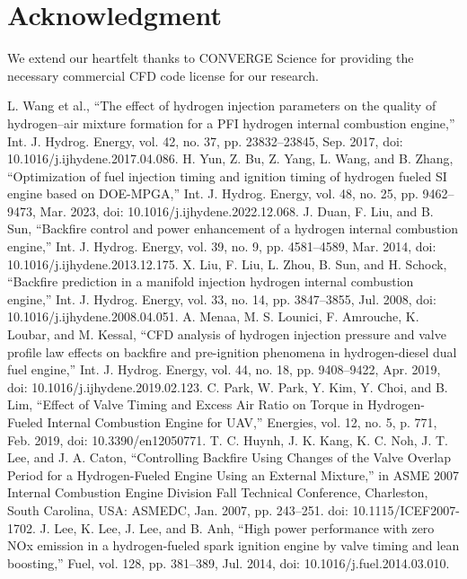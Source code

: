 \documentclass[conference]{IEEEtran}
\begin{document}
\section*{Acknowledgment}
We extend our heartfelt thanks to CONVERGE Science for providing the necessary commercial CFD code license for our research.

\begin{thebibliography}{00}
 L. Wang et al., “The effect of hydrogen injection parameters on the quality of hydrogen–air mixture formation for a PFI hydrogen internal combustion engine,” Int. J. Hydrog. Energy, vol. 42, no. 37, pp. 23832–23845, Sep. 2017, doi: 10.1016/j.ijhydene.2017.04.086.
 H. Yun, Z. Bu, Z. Yang, L. Wang, and B. Zhang, “Optimization of fuel injection timing and ignition timing of hydrogen fueled SI engine based on DOE-MPGA,” Int. J. Hydrog. Energy, vol. 48, no. 25, pp. 9462–9473, Mar. 2023, doi: 10.1016/j.ijhydene.2022.12.068.
 J. Duan, F. Liu, and B. Sun, “Backfire control and power enhancement of a hydrogen internal combustion engine,” Int. J. Hydrog. Energy, vol. 39, no. 9, pp. 4581–4589, Mar. 2014, doi: 10.1016/j.ijhydene.2013.12.175.
 X. Liu, F. Liu, L. Zhou, B. Sun, and H. Schock, “Backfire prediction in a manifold injection hydrogen internal combustion engine,” Int. J. Hydrog. Energy, vol. 33, no. 14, pp. 3847–3855, Jul. 2008, doi: 10.1016/j.ijhydene.2008.04.051.
 A. Menaa, M. S. Lounici, F. Amrouche, K. Loubar, and M. Kessal, “CFD analysis of hydrogen injection pressure and valve profile law effects on backfire and pre-ignition phenomena in hydrogen-diesel dual fuel engine,” Int. J. Hydrog. Energy, vol. 44, no. 18, pp. 9408–9422, Apr. 2019, doi: 10.1016/j.ijhydene.2019.02.123.
 C. Park, W. Park, Y. Kim, Y. Choi, and B. Lim, “Effect of Valve Timing and Excess Air Ratio on Torque in Hydrogen-Fueled Internal Combustion Engine for UAV,” Energies, vol. 12, no. 5, p. 771, Feb. 2019, doi: 10.3390/en12050771.
 T. C. Huynh, J. K. Kang, K. C. Noh, J. T. Lee, and J. A. Caton, “Controlling Backfire Using Changes of the Valve Overlap Period for a Hydrogen-Fueled Engine Using an External Mixture,” in ASME 2007 Internal Combustion Engine Division Fall Technical Conference, Charleston, South Carolina, USA: ASMEDC, Jan. 2007, pp. 243–251. doi: 10.1115/ICEF2007-1702.
 J. Lee, K. Lee, J. Lee, and B. Anh, “High power performance with zero NOx emission in a hydrogen-fueled spark ignition engine by valve timing and lean boosting,” Fuel, vol. 128, pp. 381–389, Jul. 2014, doi: 10.1016/j.fuel.2014.03.010.

\end{thebibliography}
\end{document}
